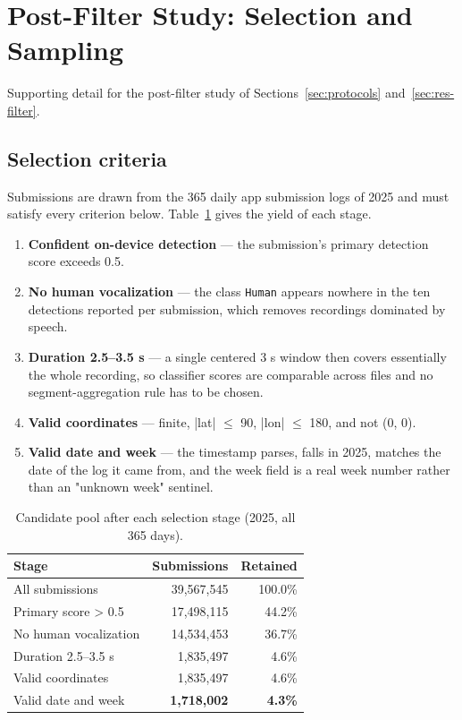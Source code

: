 \section{Post-Filter Study: Selection and Sampling}
\label{sec:F-post-filter-study-selection-and-sampling}

Supporting detail for the post-filter study of Sections~\ref{sec:protocols} and~\ref{sec:res-filter}.

\subsection{Selection criteria}
\label{sec:F-1-selection-criteria}

Submissions are drawn from the 365 daily app submission logs of 2025 and must satisfy every criterion below. Table~\ref{tab:f-1} gives the yield of each stage.

\begin{enumerate}
  \item \textbf{Confident on-device detection} --- the submission's primary detection score exceeds
0.5.
  \item \textbf{No human vocalization} --- the class \texttt{Human} appears nowhere in the ten detections
reported per submission, which removes recordings dominated by speech.
  \item \textbf{Duration 2.5--3.5 s} --- a single centered 3 s window then covers essentially the whole
recording, so classifier scores are comparable across files and no segment-aggregation rule has to be chosen.
  \item \textbf{Valid coordinates} --- finite, |lat| $\leq$ 90, |lon| $\leq$ 180, and not (0, 0).
  \item \textbf{Valid date and week} --- the timestamp parses, falls in 2025, matches the date of the
log it came from, and the week field is a real week number rather than an "unknown week" sentinel.
\end{enumerate}


\begin{table}[H]
\centering
\caption{Candidate pool after each selection stage (2025, all 365 days).}
\label{tab:f-1}
\small
\begin{tabular}{lrr}
\toprule
Stage & Submissions & Retained \\
\midrule
All submissions & 39,567,545 & 100.0\% \\
Primary score > 0.5 & 17,498,115 & 44.2\% \\
No human vocalization & 14,534,453 & 36.7\% \\
Duration 2.5--3.5 s & 1,835,497 & 4.6\% \\
Valid coordinates & 1,835,497 & 4.6\% \\
Valid date and week & \textbf{1,718,002} & \textbf{4.3\%} \\
\bottomrule
\end{tabular}
\end{table}

